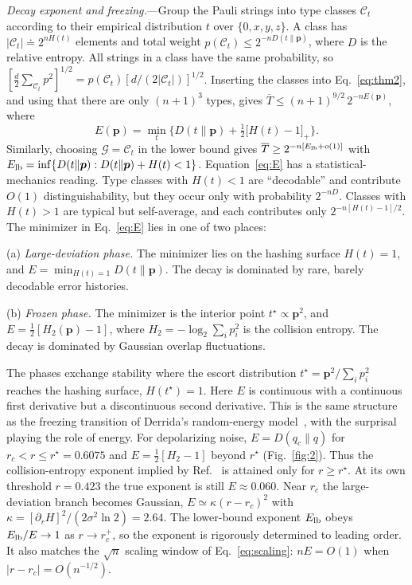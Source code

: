 \documentclass[aps,prl,twocolumn,superscriptaddress,amsmath,amssymb,10pt]{revtex4-2}
\newcommand{\Tb}{\overline{T}}
\begin{document}
\emph{Decay exponent and freezing.}---Group the Pauli strings into type classes $\mathcal C_t$ according to their empirical distribution $t$ over $\{0,x,y,z\}$. A class has $|\mathcal C_t|\doteq2^{nH(t)}$ elements and total weight $p(\mathcal C_t)\le2^{-nD(t\|\bm p)}$, where $D$ is the relative entropy. All strings in a class have the same probability, so $[\tfrac d2\sum_{\mathcal C_t}p^2]^{1/2}=p(\mathcal C_t)[d/(2|\mathcal C_t|)]^{1/2}$. Inserting the classes into Eq.~\eqref{eq:thm2}, and using that there are only $(n+1)^3$ types, gives $\Tb\le(n+1)^{9/2}\,2^{-nE(\bm p)}$, where
\begin{equation}
E(\bm p)=\min_t\Big\{D(t\|\bm p)+\tfrac12\big[H(t)-1\big]_+\Big\}.
\label{eq:E}
\end{equation}
Similarly, choosing $\mathcal G=\mathcal C_t$ in the lower bound gives $\Tb\ge2^{-n[E_{\rm lb}+o(1)]}$ with $E_{\rm lb}=\inf\{D(t\|\bm p):D(t\|\bm p)+H(t)<1\}$. Equation~\eqref{eq:E} has a statistical-mechanics reading. Type classes with $H(t)<1$ are ``decodable'' and contribute $O(1)$ distinguishability, but they occur only with probability $2^{-nD}$. Classes with $H(t)>1$ are typical but self-average, and each contributes only $2^{-n[H(t)-1]/2}$. The minimizer in Eq.~\eqref{eq:E} lies in one of two places:

\noindent(a) \emph{Large-deviation phase.} The minimizer lies on the hashing surface $H(t)=1$, and $E=\min_{H(t)=1}D(t\|\bm p)$. The decay is dominated by rare, barely decodable error histories.

\noindent(b) \emph{Frozen phase.} The minimizer is the interior point $t^\star\propto\bm p^2$, and $E=\tfrac12[H_2(\bm p)-1]$, where $H_2=-\log_2\sum_ip_i^2$ is the collision entropy. The decay is dominated by Gaussian overlap fluctuations.

The phases exchange stability where the escort distribution $t^\star=\bm p^2/\sum_i p_i^2$ reaches the hashing surface, $H(t^\star)=1$. Here $E$ is continuous with a continuous first derivative but a discontinuous second derivative. This is the same structure as the freezing transition of Derrida's random-energy model~\cite{Derrida}, with the surprisal playing the role of energy. For depolarizing noise, $E=D(q_c\|q)$ for $r_c<r\le r^\star=0.6075$ and $E=\tfrac12[H_2-1]$ beyond $r^\star$ (Fig.~\ref{fig:2}). Thus the collision-entropy exponent implied by Ref.~\cite{Liu2026} is attained only for $r\ge r^\star$. At its own threshold $r=0.423$ the true exponent is still $E\approx0.060$. Near $r_c$ the large-deviation branch becomes Gaussian, $E\simeq\kappa(r-r_c)^2$ with $\kappa=[\partial_rH]^2/(2\sigma^2\ln2)=2.64$. The lower-bound exponent $E_{\rm lb}$ obeys $E_{\rm lb}/E\to1$ as $r\to r_c^+$, so the exponent is rigorously determined to leading order. It also matches the $\sqrt n$ scaling window of Eq.~\eqref{eq:scaling}: $nE=O(1)$ when $|r-r_c|=O(n^{-1/2})$.
\end{document}

